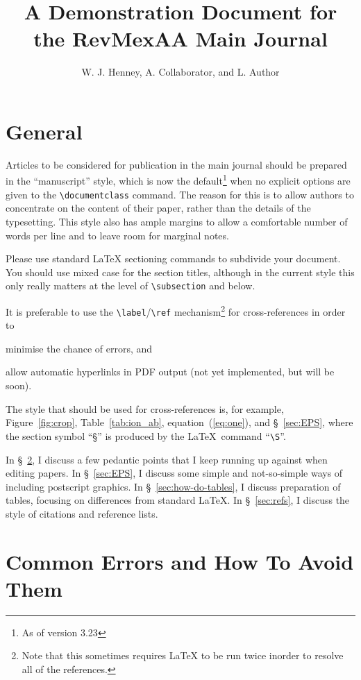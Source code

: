 \documentclass[debug]{rmaa}
\title{A Demonstration Document for the RevMexAA Main Journal}
\author{
  W. J. Henney,\altaffilmark{1} 
  A. Collaborator,\altaffilmark{2}
  and L. Author\altaffilmark{2,3,4}}
\newcommand{\CS}[1]{\texttt{\textbackslash #1}}
\begin{document}
\maketitle


\section{General}
\label{sec:intro}

Articles to be considered for publication in the main journal should
be prepared in the ``manuscript'' style, which is now the
default\footnote{As of version 3.23} when no explicit options are
given to the \CS{documentclass} command. The reason for this is to
allow authors to concentrate on the content of their paper, rather
than the details of the typesetting. This style also has ample margins
to allow a comfortable number of words per line and to leave room for
marginal notes.

Please use standard \LaTeX{} sectioning commands to subdivide your
document. You should use mixed case for the section titles, although
in the current style this only really matters at the level of
\CS{subsection} and below.

It is preferable to use the \CS{label}/\CS{ref}
mechanism\footnote{Note that this sometimes requires \LaTeX{} to be
  run twice inorder to resolve all of the references.} for
cross-references in order to
\begin{inparaenum}[(1)]
\item minimise the chance of errors, and 
\item allow automatic hyperlinks in PDF output (not yet implemented,
  but will be soon). 
\end{inparaenum}

The style that should be used for cross-references is, for example,
Figure~\ref{fig:crop}, Table~\ref{tab:ion_ab},
equation~(\ref{eq:one}), and \S~\ref{sec:EPS}, where the section
symbol ``\S'' is produced by the \LaTeX\ command ``\CS{S}''.

In \S~\ref{sec:errors}, I discuss a few pedantic points that I keep
running up against when editing papers. In \S~\ref{sec:EPS}, I discuss
some simple and not-so-simple ways of including postscript
graphics. In \S~\ref{sec:how-do-tables}, I discuss preparation of
tables, focusing on differences from standard \LaTeX{}. In
\S~\ref{sec:refs}, I discuss the style of citations and reference
lists.

\section{Common Errors and How To Avoid Them}
\label{sec:errors}
\end{document}
